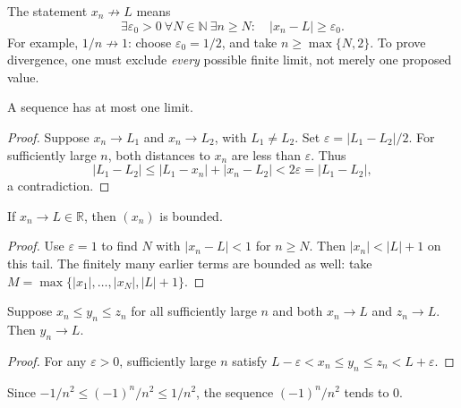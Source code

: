 \begin{remark}
The statement $x_n\not\to L$ means
\[
\exists\varepsilon_0>0\ \forall N\in\mathbb N\ \exists n\geq N:
\quad |x_n-L|\geq\varepsilon_0.
\]
For example, $1/n\not\to1$: choose $\varepsilon_0=1/2$, and take
$n\geq\max\{N,2\}$. To prove divergence, one must exclude \emph{every}
possible finite limit, not merely one proposed value.
\end{remark}

\begin{theorem}
A sequence has at most one limit.
\end{theorem}
\begin{proof}
Suppose $x_n\to L_1$ and $x_n\to L_2$, with $L_1\ne L_2$. Set
$\varepsilon=|L_1-L_2|/2$. For sufficiently large $n$, both distances to
$x_n$ are less than $\varepsilon$. Thus
\[
|L_1-L_2|\leq|L_1-x_n|+|x_n-L_2|<2\varepsilon=|L_1-L_2|,
\]
a contradiction.
\end{proof}

\begin{theorem}\label{thm:analysis-bounded}
If $x_n\to L\in\mathbb R$, then $(x_n)$ is bounded.
\end{theorem}
\begin{proof}
Use $\varepsilon=1$ to find $N$ with $|x_n-L|<1$ for $n\geq N$.
Then $|x_n|<|L|+1$ on this tail. The finitely many earlier terms are bounded
as well: take $M=\max\{|x_1|,\ldots,|x_N|,|L|+1\}$.
\end{proof}

\begin{theorem}\label{thm:analysis-sandwich}
Suppose $x_n\leq y_n\leq z_n$ for all sufficiently large $n$ and both
$x_n\to L$ and $z_n\to L$. Then $y_n\to L$.
\end{theorem}
\begin{proof}
For any $\varepsilon>0$, sufficiently large $n$ satisfy
$L-\varepsilon<x_n\leq y_n\leq z_n<L+\varepsilon$.
\end{proof}
\begin{example}
Since $-1/n^2\leq(-1)^n/n^2\leq1/n^2$, the sequence $(-1)^n/n^2$ tends
to $0$.
\end{example}

